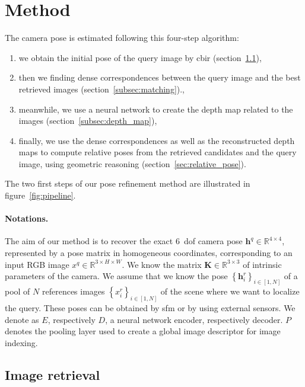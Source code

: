 \section{Method}
\label{sec:method}


The camera pose is estimated following this four-step algorithm:
\begin{enumerate}
	\item we obtain the initial pose of the query image by \ac{cbir} (section~\ref{subsec:image_indexing}),
	\item then we finding dense correspondences between the query image and the best retrieved images (section~\ref{subsec:matching}).,
	\item meanwhile, we use a neural network to create the depth map related to the images (section~\ref{subsec:depth_map}),
	\item finally, we use the dense correspondences as well as the reconstructed depth maps to compute relative poses from the retrieved candidates and the query image, using geometric reasoning (section~\ref{sec:relative_pose}).
\end{enumerate}

The two first steps of our pose refinement method are illustrated in figure~\ref{fig:pipeline}.

\paragraph{Notations.}
The aim of our method is to recover the exact 6~\ac{dof} camera pose $\mathbf{h}^q\in\mathbb{R}^{4\times 4}$, represented by a pose matrix in homogeneous coordinates, corresponding to an input RGB image $x^q\in\mathbb{R}^{3\times H\times W}$. We know the matrix $\mathbf{K}\in\mathbb{R}^{3\times 3}$ of intrinsic parameters of the camera. We assume that we know the pose $\left\{ \mathbf{h}^r_{i} \right\}_{i\in\left[1,N\right]}$ of a pool of $N$ references images $\left\{ x^{r}_i \right\}_{i\in\left[1,N\right]}$ of the scene where we want to localize the query. These poses can be obtained by \ac{sfm} or by using external sensors. We denote as $E$, respectively $D$, a neural network encoder, respectively decoder. $P$ denotes the pooling layer used to create a global image descriptor for image indexing.

\subsection{Image retrieval}
\label{subsec:image_indexing}

